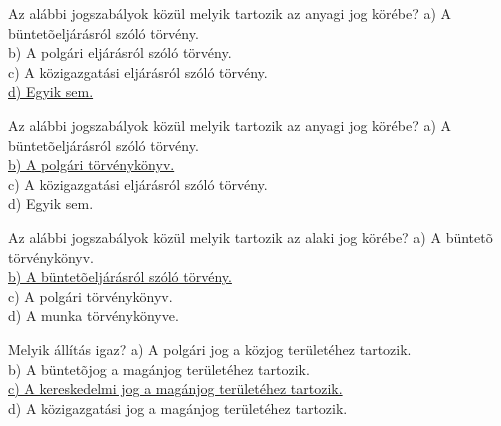 \begin{frame}

\begin{tcolorbox}[title={9. Kérdés}]
Az alábbi jogszabályok közül melyik tartozik az anyagi jog körébe?
\tcblower
a) A büntetõeljárásról szóló törvény.\\
b) A polgári eljárásról szóló törvény.\\
c) A közigazgatási eljárásról szóló törvény.\\
\uline {d) Egyik sem.}
\end{tcolorbox}

\begin{tcolorbox}[title={10. Kérdés}]
Az alábbi jogszabályok közül melyik tartozik az anyagi jog körébe?
\tcblower
a) A büntetõeljárásról szóló törvény.\\
\uline {b) A polgári törvénykönyv.}\\
c) A közigazgatási eljárásról szóló törvény.\\
d) Egyik sem.
\end{tcolorbox}

\begin{tcolorbox}[title={11. Kérdés}]
Az alábbi jogszabályok közül melyik tartozik az alaki jog körébe?
\tcblower
a) A büntetõ törvénykönyv.\\
\uline {b) A büntetõeljárásról szóló törvény.}\\
c) A polgári törvénykönyv.\\
d) A munka törvénykönyve.
\end{tcolorbox}

\begin{tcolorbox}[title={12. Kérdés}]
Melyik állítás igaz?
\tcblower
a) A polgári jog a közjog területéhez tartozik.\\
b) A büntetõjog a magánjog területéhez tartozik.\\
\uline {c) A kereskedelmi jog a magánjog területéhez tartozik.}\\
d) A közigazgatási jog a magánjog területéhez tartozik.
\end{tcolorbox}

\end{frame}


